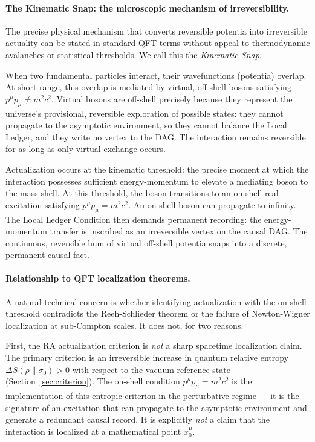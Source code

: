\documentclass[11pt,a4paper]{article}
\theoremstyle{plain}
\theoremstyle{definition}
\theoremstyle{remark}
\begin{document}
\paragraph{The Kinematic Snap: the microscopic mechanism of irreversibility.}
The precise physical mechanism that converts reversible potentia into irreversible
actuality can be stated in standard QFT terms without appeal to thermodynamic
avalanches or statistical thresholds. We call this the \emph{Kinematic Snap}.

When two fundamental particles interact, their wavefunctions (potentia) overlap.
At short range, this overlap is mediated by virtual, off-shell bosons satisfying
$p^{\mu}p_{\mu} \neq m^{2}c^{2}$. Virtual bosons are off-shell precisely because
they represent the universe's provisional, reversible exploration of possible
states: they cannot propagate to the asymptotic environment, so they cannot
balance the Local Ledger, and they write no vertex to the DAG. The interaction
remains reversible for as long as only virtual exchange occurs.

Actualization occurs at the kinematic threshold: the precise moment at which the
interaction possesses sufficient energy-momentum to elevate a mediating boson to
the mass shell. At this threshold, the boson transitions to an on-shell real
excitation satisfying $p^{\mu}p_{\mu} = m^{2}c^{2}$. An on-shell boson can
propagate to infinity. The Local Ledger Condition then demands permanent recording:
the energy-momentum transfer is inscribed as an irreversible vertex on the causal
DAG. The continuous, reversible hum of virtual off-shell potentia snaps into a
discrete, permanent causal fact.

\paragraph{Relationship to QFT localization theorems.}
\label{sec:localization}
A natural technical concern is whether identifying actualization with the on-shell
threshold contradicts the Reeh-Schlieder theorem or the failure of Newton-Wigner
localization at sub-Compton scales. It does not, for two reasons.

First, the RA actualization criterion is \emph{not} a sharp spacetime localization
claim. The primary criterion is an irreversible increase in quantum relative
entropy $\Delta S(\rho \| \sigma_0) > 0$ with respect to the vacuum reference
state (Section~\ref{sec:criterion}). The on-shell condition $p^{\mu}p_{\mu} =
m^2 c^2$ is the implementation of this entropic criterion in the perturbative
regime --- it is the signature of an excitation that can propagate to the
asymptotic environment and generate a redundant causal record. It is explicitly
\emph{not} a claim that the interaction is localized at a mathematical point
$x_0^\mu$.
\end{document}
